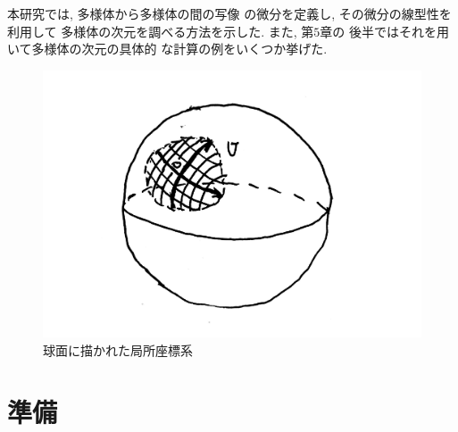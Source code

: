 \documentclass[a4j,12pt]{jarticle}
\theoremstyle{definition}
\begin{document}
本研究では, 多様体から多様体の間の写像
の微分を定義し, その微分の線型性を利用して 
多様体の次元を調べる方法を示した. また, 第$5$章の
後半ではそれを用いて多様体の次元の具体的
な計算の例をいくつか挙げた. 
\begin{figure}[H]
    \centering
    \includegraphics[keepaspectratio, scale=0.3]
         {CoSysInS2.pdf}
    \caption{球面に描かれた局所座標系}
    \label{CoSysInS2}
   \end{figure}
\newpage
%
\section{準備}
\end{document}
